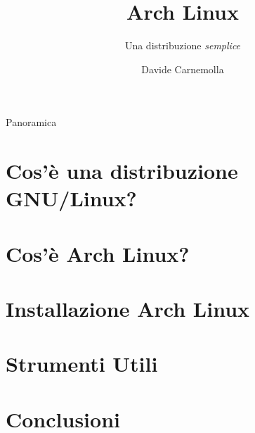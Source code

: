 \documentclass[aspectratio=43,xcolor=dvipsnames]{beamer}
\title{Arch Linux}
\subtitle{Una distribuzione \emph{semplice}}
\author {Davide Carnemolla}
\institute %
{
    Dipartimento di Matematica e Informatica \\
    Università degli Studi di Catania
    \vskip 100pt
    Saturday Morning Snippets 2021
}
\date{}
\begin{document}
\begin{frame}
    \titlepage
\end{frame}

\begin{frame}{Panoramica}
    \tableofcontents
\end{frame}

\section{Cos'è una distribuzione GNU/Linux?}


\section{Cos'è Arch Linux?}


\section{Installazione Arch Linux}


\section{Strumenti Utili}


\section{Conclusioni}




\end{document}
